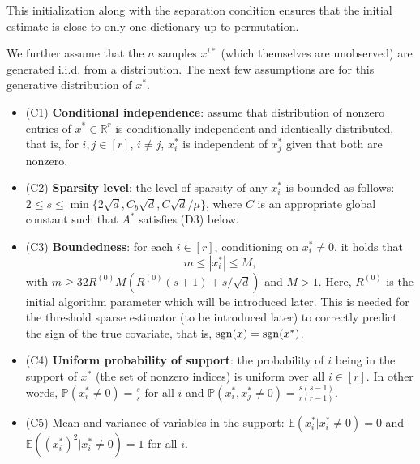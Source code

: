This initialization along with the separation condition ensures that the initial estimate is close to only one dictionary up to permutation.

We further assume that the $n$ samples $x^{i*}$ (which themselves are unobserved) are generated i.i.d. from a distribution. The next few assumptions are for this
generative distribution of $x^*$.
\begin{itemize}
    \item (C1) \textbf{Conditional independence}: assume that distribution of nonzero entries of $x^*\in \mathbb{R}^{r}$ is conditionally independent and identically distributed, that is, for $i,j\in [r]$, $i\neq j$, $x_i^*$ is independent of $x_j^*$ given that both are nonzero. 
    \item (C2) \textbf{Sparsity level}: the level of sparsity of any $x_i^*$ is bounded as follows: $2\leq s \leq \min\{2 \sqrt{d}, C_b \sqrt{d}, C\sqrt{d}/\mu \}$, where $C$ is an appropriate global constant such that $A^*$ satisfies (D3) below. 
    \item (C3) \textbf{Boundedness}: for each $i\in [r]$, conditioning on $x^*_i\neq 0$, it holds that 
    \[ m \leq |x^*_i|\leq M, \]
    with $m\geq 32 R^{(0)} M(R^{(0)} (s+1) + s/\sqrt{d} )$ and $M>1$. Here, $R^{(0)}$ is the initial algorithm parameter which will be introduced later. This is needed for the threshold sparse estimator (to be introduced later) to correctly predict the sign of the true covariate, that is, ${\rm sgn}(x) = {\rm sgn}(x^*)$. 
    \item (C4) \textbf{Uniform probability of support}: the probability of $i$ being in the support of $x^*$ (the set of nonzero indices) is uniform over all $i\in [r]$. In other words, 
    $\mathbb{P}(x^*_i \neq 0) = \frac{s}{s}$ for all $i$ and $\mathbb{P}(x^*_i, x^*_j \neq 0) = \frac{s(s-1)}{r(r-1)}$. 
    \item (C5) Mean and variance of variables in the support: $\mathbb{E}(x_i^*|x_i^*\neq 0) = 0$ and $\mathbb{E}((x_i^*)^2|x_i^*\neq 0) = 1$ for all $i$. 
\end{itemize}

